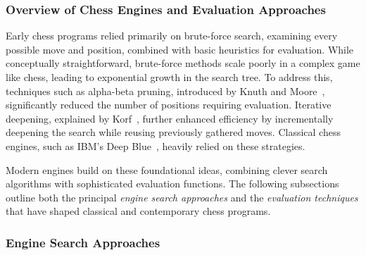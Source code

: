 \documentclass[12pt,a4paper]{article}
\begin{document}
\subsubsection{Overview of Chess Engines and Evaluation Approaches}
Early chess programs relied primarily on brute-force search, examining every possible move and position, combined with basic heuristics for evaluation. While conceptually straightforward, brute-force methods scale poorly in a complex game like chess, leading to exponential growth in the search tree. To address this, techniques such as alpha-beta pruning, introduced by Knuth and Moore~\cite{Knuth1975}, significantly reduced the number of positions requiring evaluation. Iterative deepening, explained by Korf~\cite{Korf1985}, further enhanced efficiency by incrementally deepening the search while reusing previously gathered moves. Classical chess engines, such as IBM’s Deep Blue~\cite{Campbell2002DeepBlue}, heavily relied on these strategies. 

Modern engines build on these foundational ideas, combining clever search algorithms with sophisticated evaluation functions. The following subsections outline both the principal \emph{engine search approaches} and the \emph{evaluation techniques} that have shaped classical and contemporary chess programs.

\subsubsection{Engine Search Approaches}
\label{sec:engine_search_approaches}
\end{document}
